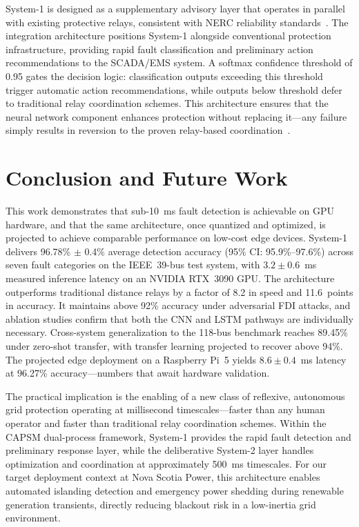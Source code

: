 \documentclass[journal]{IEEEtran}
\begin{document}
System-1 is designed as a supplementary advisory layer that operates in parallel with existing protective relays, consistent with NERC reliability standards~\cite{ref37}. The integration architecture positions System-1 alongside conventional protection infrastructure, providing rapid fault classification and preliminary action recommendations to the SCADA/EMS system. A softmax confidence threshold of 0.95 gates the decision logic: classification outputs exceeding this threshold trigger automatic action recommendations, while outputs below threshold defer to traditional relay coordination schemes. This architecture ensures that the neural network component enhances protection without replacing it---any failure simply results in reversion to the proven relay-based coordination~\cite{ref23}.

\section{Conclusion and Future Work}
\label{sec:conclusion}

This work demonstrates that sub-10~ms fault detection is achievable on GPU hardware, and that the same architecture, once quantized and optimized, is projected to achieve comparable performance on low-cost edge devices. System-1 delivers 96.78\% $\pm$ 0.4\% average detection accuracy (95\% CI: 95.9\%--97.6\%) across seven fault categories on the IEEE~39-bus test system, with $3.2 \pm 0.6$~ms measured inference latency on an NVIDIA RTX~3090 GPU. The architecture outperforms traditional distance relays by a factor of 8.2 in speed and 11.6~points in accuracy. It maintains above 92\% accuracy under adversarial FDI attacks, and ablation studies confirm that both the CNN and LSTM pathways are individually necessary. Cross-system generalization to the 118-bus benchmark reaches 89.45\% under zero-shot transfer, with transfer learning projected to recover above 94\%. The projected edge deployment on a Raspberry Pi~5 yields $8.6 \pm 0.4$~ms latency at 96.27\% accuracy---numbers that await hardware validation.

The practical implication is the enabling of a new class of reflexive, autonomous grid protection operating at millisecond timescales---faster than any human operator and faster than traditional relay coordination schemes. Within the CAPSM dual-process framework, System-1 provides the rapid fault detection and preliminary response layer, while the deliberative System-2 layer handles optimization and coordination at approximately 500~ms timescales. For our target deployment context at Nova Scotia Power, this architecture enables automated islanding detection and emergency power shedding during renewable generation transients, directly reducing blackout risk in a low-inertia grid environment.
\end{document}
